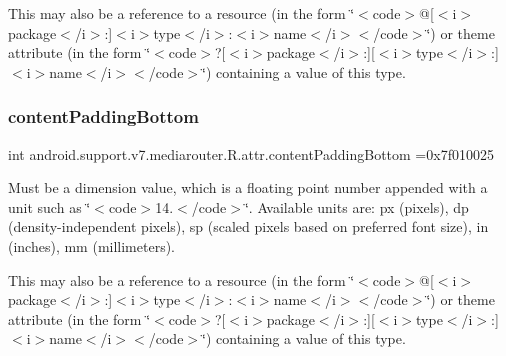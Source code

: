 This may also be a reference to a resource (in the form \char`\"{}$<$code$>$@\mbox{[}$<$i$>$package$<$/i$>$\+:\mbox{]}$<$i$>$type$<$/i$>$\+:$<$i$>$name$<$/i$>$$<$/code$>$\char`\"{}) or theme attribute (in the form \char`\"{}$<$code$>$?\mbox{[}$<$i$>$package$<$/i$>$\+:\mbox{]}\mbox{[}$<$i$>$type$<$/i$>$\+:\mbox{]}$<$i$>$name$<$/i$>$$<$/code$>$\char`\"{}) containing a value of this type. \mbox{\label{classandroid_1_1support_1_1v7_1_1mediarouter_1_1R_1_1attr_a4e2c931123e93be190daf6768973d35e}} 
\subsubsection{\texorpdfstring{content\+Padding\+Bottom}{contentPaddingBottom}}
{\footnotesize\ttfamily int android.\+support.\+v7.\+mediarouter.\+R.\+attr.\+content\+Padding\+Bottom =0x7f010025\hspace{0.3cm}{\ttfamily [static]}}

Must be a dimension value, which is a floating point number appended with a unit such as \char`\"{}$<$code$>$14.\+5sp$<$/code$>$\char`\"{}. Available units are\+: px (pixels), dp (density-\/independent pixels), sp (scaled pixels based on preferred font size), in (inches), mm (millimeters). 

This may also be a reference to a resource (in the form \char`\"{}$<$code$>$@\mbox{[}$<$i$>$package$<$/i$>$\+:\mbox{]}$<$i$>$type$<$/i$>$\+:$<$i$>$name$<$/i$>$$<$/code$>$\char`\"{}) or theme attribute (in the form \char`\"{}$<$code$>$?\mbox{[}$<$i$>$package$<$/i$>$\+:\mbox{]}\mbox{[}$<$i$>$type$<$/i$>$\+:\mbox{]}$<$i$>$name$<$/i$>$$<$/code$>$\char`\"{}) containing a value of this type. \mbox{\label{classandroid_1_1support_1_1v7_1_1mediarouter_1_1R_1_1attr_a5cd1edc7348ee2fafe0dbdec252e01f2}} 
